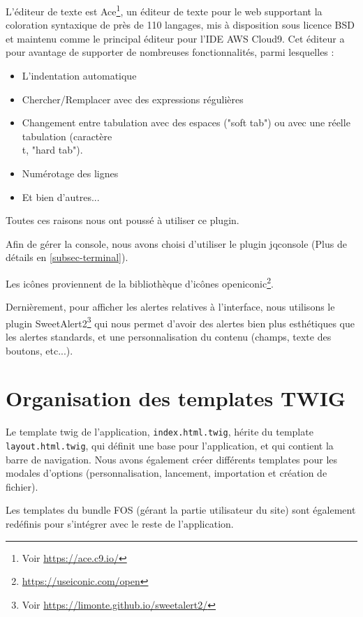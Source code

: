 L'éditeur de texte est Ace\footnote{Voir \url{https://ace.c9.io/}}, un éditeur de texte pour le web supportant la coloration syntaxique de près de 110 langages, mis à disposition sous licence BSD et maintenu comme le principal éditeur pour l'IDE AWS Cloud9. Cet éditeur a pour avantage de supporter de nombreuses fonctionnalités, parmi lesquelles :

\begin{itemize}
  \item L'indentation automatique
  \item Chercher/Remplacer avec des expressions régulières
  \item Changement entre tabulation avec des espaces ("soft tab") ou avec une réelle tabulation (caractère \\t, "hard tab").
  \item Numérotage des lignes
  \item Et bien d'autres...
\end{itemize}

Toutes ces raisons nous ont poussé à utiliser ce plugin.

Afin de gérer la console, nous avons choisi d'utiliser le plugin jqconsole (Plus de détails en \ref{subsec-terminal}).

Les icônes proviennent de la bibliothèque d'icônes openiconic\footnote{\url{https://useiconic.com/open}}.

Dernièrement, pour afficher les alertes relatives à l'interface, nous utilisons le plugin SweetAlert2\footnote{Voir \url{https://limonte.github.io/sweetalert2/}} qui nous permet d'avoir des alertes bien plus esthétiques que les alertes standards, et une personnalisation du contenu (champs, texte des boutons, etc...).

\section{Organisation des templates TWIG}

Le template twig de l'application, \texttt{index.html.twig}, hérite du template \texttt{layout.html.twig}, qui définit une base pour l'application, et qui contient la barre de navigation. Nous avons également créer différents templates pour les modales d'options (personnalisation, lancement, importation et création de fichier).

Les templates du bundle FOS (gérant la partie utilisateur du site) sont également redéfinis pour s'intégrer avec le reste de l'application.

